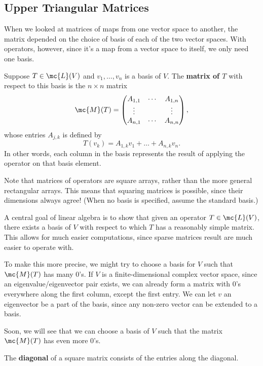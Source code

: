 \documentclass[math0540-lecture-notes.tex]{subfiles}
\begin{document}
\subsection{Upper Triangular Matrices}
When we looked at matrices of maps from one vector space to another, the matrix depended on the
choice of basis of each of the two vector spaces. With operators, however, since it's a map from a
vector space to itself, we only need one basis.
\begin{definition}{}
  Suppose $T\in \mc{L}(V)$ and $v_1,\ldots,v_n$ is a basis of $V$. The \textbf{matrix of $T$} with
  respect to this basis is the $n\times n$ matrix \[
    \mc{M}(T)=\begin{pmatrix} A_{1,1}&\cdots&A_{1,n}\\ \vdots& &\vdots \\ A_{n,1}&\cdots&A_{n,n} \end{pmatrix} 
  ,\] whose entries $A_{j,k}$ is defined by \[
    T(v_k)=A_{1,k}v_1+\ldots+A_{n,k}v_n
  .\] In other words, each column in the basis represents the result of applying the operator on
  that basis element.
\end{definition}
Note that matrices of operators are square arrays, rather than the more general rectangular arrays.
This means that squaring matrices is possible, since their dimensions always agree! (When no basis
is specified, assume the standard basis.)

A central goal of linear algebra is to show that given an operator $T\in \mc{L}(V)$, there exists a
basis of $V$ with respect to which $T$ has a reasonably simple matrix. This allows for much easier
computations, since sparse matrices result are much easier to operate with.

To make this more precise, we might try to choose a basis for $V$ such that $\mc{M}(T)$ has many
$0$'s. If $V$ is a finite-dimensional complex vector space, since an eigenvalue/eigenvector pair
exists, we can already form a matrix with $0$'s everywhere along the first column, except the first
entry. We can let $v$ an eigenvector be a part of the basis, since any non-zero vector can be
extended to a basis.

Soon, we will see that we can choose a basis of $V$ such that the matrix $\mc{M}(T)$ has even more
$0$'s.

\begin{definition}{}
  The \textbf{diagonal} of a square matrix consists of the entries along the diagonal.
\end{definition}
\end{document}
